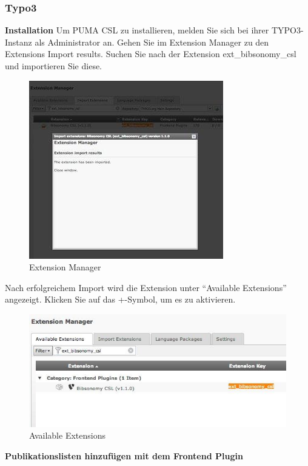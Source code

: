 \subsubsection{Typo3}
\textbf{Installation}\newline\newline
Um PUMA CSL zu installieren, melden Sie sich bei ihrer TYPO3-Instanz als Administrator an. Gehen Sie im Extension Manager zu den Extensions Import results. Suchen Sie nach der Extension ext\_bibsonomy\_csl und importieren Sie diese.
\begin{figure}[ht]
 \centering
 \includegraphics[scale=0.4]{puma-97}
 \caption{Extension Manager}
 \label{figure1}
\end{figure}
Nach erfolgreichem Import wird die Extension unter \enquote{Available Extensions} angezeigt. Klicken Sie auf das +-Symbol, um es zu aktivieren.
\begin{figure}[ht]
 \centering
 \includegraphics[scale=0.4]{puma-98}
 \caption{Available Extensions}
 \label{figure1}
\end{figure}
\newline\newline
\textbf{Publikationslisten hinzufügen mit dem Frontend Plugin}\newline\newline
